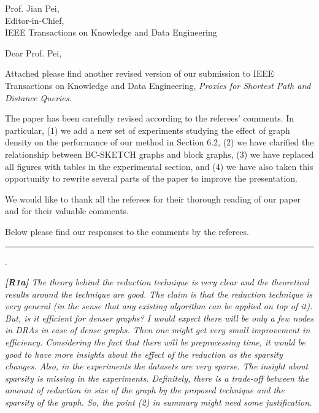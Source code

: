 \documentclass[11pt]{letter}
\date{}
\newcommand{\svs}{\vspace{0.36ex}}
\newcommand{\stitle}[1]{\vspace{0.5ex} \noindent{\bf #1}}
\begin{document}
\noindent
Prof. Jian Pei,\\
Editor-in-Chief,\\
IEEE Transactions on Knowledge and Data Engineering

\vspace{0.3cm}
\noindent
Dear Prof. Pei,


Attached please find another revised version of our submission to IEEE Transactions on Knowledge and Data Engineering,
{\em Proxies for Shortest Path and Distance Queries}.

The paper has been carefully revised according to the referees' comments. In particular,
%
(1) we add a new set of experiments studying the effect of graph density on the performance of our method in Section 6.2,
%
(2) we have clarified the relationship between BC-SKETCH graphs and block graphs,
%
(3) we have replaced all figures with tables in the experimental section, and
%
(4) we have also taken this opportunity to rewrite several parts of the paper to improve the presentation.



We would like to thank all the referees for their thorough reading of our
paper and for their valuable comments.

Below please find our responses to the comments by the referees.

\vspace{3.6ex}
\hrule
\vspace{0.6ex}

\vspace{2ex} \stitle{Response to the comments of Referee 1}.

{\em
{\bf [R1a]} The theory behind the reduction technique is very clear and the theoretical results around the technique are good. The claim is that the reduction technique is very general
(in the sense that any existing algorithm can be applied on top of it).
But, is it efficient for denser graphs? I would expect there will be only a few nodes in DRAs in case of dense graphs. Then one might get very small improvement in efficiency. Considering
the fact that there will be preprocessing time, it would be good to have more insights about the effect of the reduction as the sparsity changes. Also, in the experiments the datasets are very sparse.
The insight about sparsity is missing in the experiments. Definitely, there is a trade-off between the amount of reduction in size of the graph by the proposed technique and the sparsity of the graph.
So, the point (2) in summary might need some justification.
}
\svs
\end{document}
